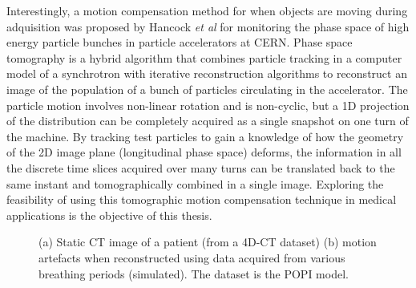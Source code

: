 Interestingly, a motion compensation method for when objects are moving during adquisition was proposed by Hancock \textit{et al}\cite{pst1}\cite{pst2}\cite{pstweb} for monitoring the phase space of high energy particle bunches in particle accelerators at CERN. Phase space tomography is a hybrid algorithm that combines particle tracking in a computer model of a synchrotron with iterative reconstruction algorithms to reconstruct an image of the population of a bunch of particles circulating in the accelerator. The particle motion involves non-linear rotation and is non-cyclic, but a 1D projection of the distribution can be completely acquired as a single snapshot on one turn of the machine. By tracking test particles to gain a knowledge of how the geometry of the 2D image plane (longitudinal phase space) deforms, the information in all the discrete time slices acquired over many turns can be translated back to the same instant and tomographically combined in a single image.  Exploring the feasibility of using this tomographic motion compensation technique in medical applications is the objective of this thesis.

\begin{figure}

\begin{center} 
 
\caption[Motion blurr in lung CBCT]{\label{fig:motionblurr}(a) Static CT image of a patient (from a 4D-CT dataset) (b) motion artefacts when reconstructed using data acquired from various breathing periods (simulated). The dataset is the POPI model\cite{popi-modelweb}.}
\end{center} 
\end{figure}


